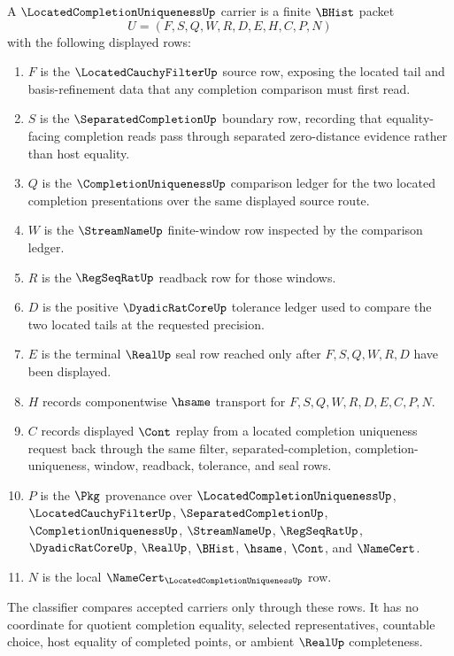 \begin{definition}
\label{def:located-completion-uniqueness-carrier}
A $\LocatedCompletionUniquenessUp$ carrier is a finite $\BHist$ packet
$$
U=(F,S,Q,W,R,D,E,H,C,P,N)
$$
with the following displayed rows:
\begin{enumerate}
\item $F$ is the $\LocatedCauchyFilterUp$ source row, exposing the located tail and basis-refinement data that any completion comparison must first read.
\item $S$ is the $\SeparatedCompletionUp$ boundary row, recording that equality-facing completion reads pass through separated zero-distance evidence rather than host equality.
\item $Q$ is the $\CompletionUniquenessUp$ comparison ledger for the two located completion presentations over the same displayed source route.
\item $W$ is the $\StreamNameUp$ finite-window row inspected by the comparison ledger.
\item $R$ is the $\RegSeqRatUp$ readback row for those windows.
\item $D$ is the positive $\DyadicRatCoreUp$ tolerance ledger used to compare the two located tails at the requested precision.
\item $E$ is the terminal $\RealUp$ seal row reached only after $F,S,Q,W,R,D$ have been displayed.
\item $H$ records componentwise $\hsame$ transport for $F,S,Q,W,R,D,E,C,P,N$.
\item $C$ records displayed $\Cont$ replay from a located completion uniqueness request back through the same filter, separated-completion, completion-uniqueness, window, readback, tolerance, and seal rows.
\item $P$ is the $\Pkg$ provenance over $\LocatedCompletionUniquenessUp$, $\LocatedCauchyFilterUp$, $\SeparatedCompletionUp$, $\CompletionUniquenessUp$, $\StreamNameUp$, $\RegSeqRatUp$, $\DyadicRatCoreUp$, $\RealUp$, $\BHist$, $\hsame$, $\Cont$, and $\NameCert$.
\item $N$ is the local $\NameCert_{\LocatedCompletionUniquenessUp}$ row.
\end{enumerate}
The classifier compares accepted carriers only through these rows. It has no coordinate for quotient completion equality, selected representatives, countable choice, host equality of completed points, or ambient $\RealUp$ completeness.
\end{definition}

